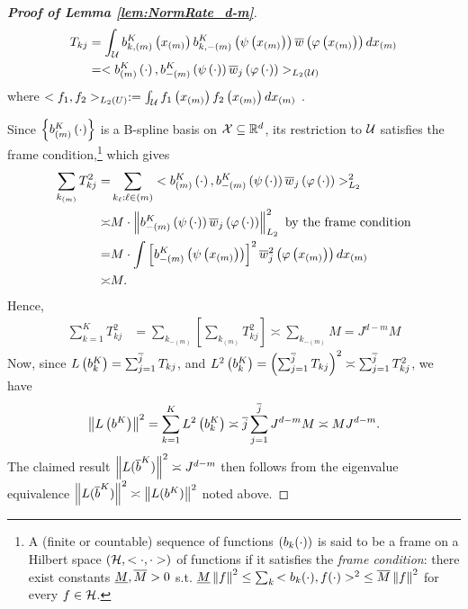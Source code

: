 \documentclass[12pt,american]{article}
\theoremstyle{definition}
\theoremstyle{plain}
\theoremstyle{definition}
\theoremstyle{plain}
\theoremstyle{plain}
\theoremstyle{plain}
\theoremstyle{plain}
\theoremstyle{plain}
\newcommand{\R}{\mathbb{R}}
\newcommand{\norm}[1]{\left\| #1 \right\|}
\begin{document}
\begin{proof}[\textbf{Proof of Lemma \ref{lem:NormRate_d-m}}]
\begin{align*}
T_{kj} & =\int_{{\cal {\cal U}}}b_{k,\left(m\right)}^{K}\left(x_{\left(m\right)}\right)b_{k,-\left(m\right)}^{K}\left(\psi\left(x_{\left(m\right)}\right)\right)\overline{w}\left(\varphi\left(x_{\left(m\right)}\right)\right)dx_{\left(m\right)}\\
 & =<b_{\left(m\right)}^{K}\left(\cdot\right),b_{-\left(m\right)}^{K}\left(\psi\left(\cdot\right)\right)\overline{w}_{j}\left(\varphi\left(\cdot\right)\right)>_{L_{2}\left({\cal U}\right)}
\end{align*}
where $<f_{1},f_{2}>_{L_{2}\left(U\right)}:=\int_{{\cal U}}f_{1}\left(x_{\left(m\right)}\right)f_{2}\left(x_{\left(m\right)}\right)dx_{\left(m\right)}$
.

Since $\left\{ b_{\left(m\right)}^{K}\left(\cdot\right)\right\} $
is a B-spline basis on ${\cal X}\subseteq\R^{d}$,
its restriction to ${\cal U}$ satisfies the frame condition,\footnote{A (finite or countable) sequence of functions $(b_{k}(\cdot))$ is said
to be a frame on a Hilbert space $({\cal H},<\cdot,\cdot>)$ of functions
if it satisfies the \emph{frame condition}: there exist constants
$\underline{M},\overline{M}>0$ s.t. $\ul M\norm f^{2}\leq\sum_{k}{<b_{k}(\cd),f(\cd)>^{2}}\leq\ol M\norm f^{2}$
for every $f\in{\cal H}$.} which gives
\begin{align*}
\sum_{k_{(m)}}T_{kj}^{2}= & \sum_{k_{\ell}:\ell\in\left(m\right)}<b_{\left(m\right)}^{K}\left(\cd\right),b_{-\left(m\right)}^{K}\left(\psi\left(\cd\right)\right)\ol w_{j}\left(\varphi\left(\cd\right)\right)>_{L_{2}}^{2}\\
\asymp & M\cd\norm{b_{-\left(m\right)}^{K}\left(\psi\left(\cd\right)\right)\ol w_{j}\left(\varphi\left(\cd\right)\right)}_{L_{2}}^{2}\text{ by the frame condition}\\
= & M\cd\int\left[b_{-\left(m\right)}^{K}\left(\psi\left(x_{\left(m\right)}\right)\right)\right]^{2}\ol w_{j}^{2}\left(\varphi\left(x_{\left(m\right)}\right)\right)dx_{\left(m\right)}\\
\asymp & M.
\end{align*}
Hence,
\begin{align*}
\sum_{k=1}^{K}T_{kj}^{2} & =\sum_{k_{-(m)}}\left[\sum_{k_{(m)}}T_{kj}^{2}\right]\asymp\sum_{k_{-(m)}}M=J^{d-m}M
\end{align*}
Now, since $L\left(b_{k}^{K}\right)=\sum_{j=1}^{\overline{j}}T_{kj}$,
and $L^{2}\left(b_{k}^{K}\right)=\left(\sum_{j=1}^{\overline{j}}T_{kj}\right)^{2}\asymp\sum_{j=1}^{\overline{j}}T_{kj}^{2}$,
we have
\[
\norm{L\left(b^{K}\right)}^{2}=\sum_{k=1}^{K}L^{2}\left(b_{k}^{K}\right)\asymp\ol j\sum_{j=1}^{\ol j}J^{d-m}M\asymp M J^{d-m}.
\]
The claimed result $\norm{L(\ol b^K)}^2 \asymp J^{d-m}$ then follows from the eigenvalue equivalence
$\norm{L(\ol b^K)}^2 \asymp \norm{L(b^K)}^2$ noted above.
\end{proof}
\end{document}
